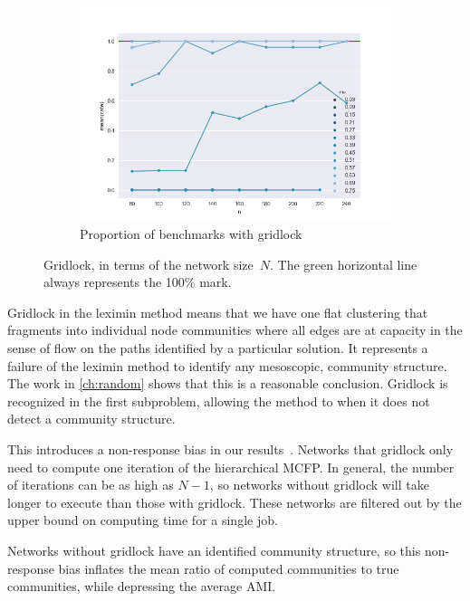 \begin{figure}
    \begin{subfigure}[b]{0.30\textwidth}
        \includegraphics[width=\textwidth]{fig/rate_vs_n}
        \caption{Proportion of benchmarks with gridlock}
        \label{fig:mouse}
    \end{subfigure}

  \caption{Gridlock, in terms of the network size~$N$. The green horizontal line always represents the 100\% mark.}
  \label{fig:n_gridlock}
\end{figure}

Gridlock in the leximin method means that we have one flat clustering that fragments into individual node communities where all edges are at capacity in the sense of flow on the paths identified by a particular solution. It represents a failure of the leximin method to identify any mesoscopic, community structure. The work in \autoref{ch:random} shows that this is a reasonable conclusion. Gridlock is recognized in the first subproblem, allowing the method to  when it does not detect a community structure.

This  introduces a non-response bias in our results~\cite{armstrong1977estimating}. Networks that gridlock only need to compute one iteration of the hierarchical MCFP. In general, the number of iterations can be as high as $N-1$, so networks without gridlock will take longer to execute than those with gridlock. These networks are filtered out by the upper bound on computing time for a single job. 

Networks without gridlock have an identified community structure, so this non-response bias inflates the mean ratio of computed communities to true communities, while depressing the average AMI.

